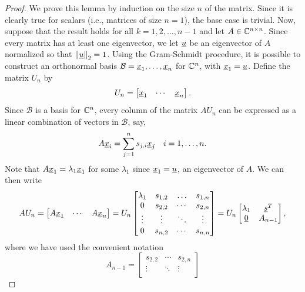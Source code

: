 \begin{proof}
We prove this lemma by induction on the size $n$ of the matrix.
Since it is clearly true for scalars (i.e., matrices of size $n=1$), the base case is trivial.
Now, suppose that the result holds for all $k=1,2,\ldots,n-1$ and let $A \in \mathbb{C}^{n \times n}$.
Since every matrix has at least one eigenvector, we let $\underline{u}$ be an eigenvector of $A$ normalized so that $\left\| \underline{u} \right\|_2 = 1$.
Using the Gram-Schmidt procedure, it is possible to construct an orthonormal basis $\mathcal{B} = \underline{x}_1, \ldots, \underline{x}_n$ for $\mathbb{C}^n$, with $\underline{x}_1 = \underline{u}$.
Define the matrix $U_n$ by
\begin{equation*}
U_n = \begin{bmatrix} \underline{x}_1 & \cdots & \underline{x}_n \end{bmatrix} .
\end{equation*}
Since $\mathcal{B}$ is a basis for $\mathbb{C}^n$, every column of the matrix $AU_n$ can be expressed as a linear combination of vectors in $\mathcal{B}$, say,
\begin{equation*}
A \underline{x}_i = \sum_{j=1}^n s_{j,i} \underline{x}_j
\quad i = 1, \ldots, n .
\end{equation*}
Note that $A \underline{x}_1 = \lambda_1 \underline{x}_1$ for some $\lambda_1$ since $\underline{x}_1 = \underline{u}$, an eigenvector of $A$.
We can then write
\begin{equation*}
A U_n = \begin{bmatrix} A \underline{x}_1 & \cdots & A \underline{x}_n \end{bmatrix}
= U_n \begin{bmatrix} \lambda_1 & s_{1,2} & \ldots & s_{1,n} \\
0 & s_{2,2} & \cdots & s_{2,n} \\
\vdots & \vdots & \ddots & \vdots \\
0 & s_{n,2} & \cdots & s_{n,n} \end{bmatrix}
= U_n \begin{bmatrix} \lambda_1 & \underline{s}^T \\
\underline{0} & A_{n-1} \end{bmatrix} ,
\end{equation*}
where we have used the convenient notation
\begin{equation*}
A_{n-1} = \begin{bmatrix} s_{2,2} & \cdots & s_{2,n} \\
\vdots & \ddots & \vdots \\

\end{bmatrix}
\end{equation*}
\end{proof}

